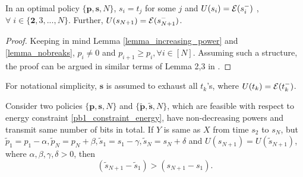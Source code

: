 \begin{lemma}
In an optimal policy $\{\bm{p},\bm{s},N\}$, $s_i=t_j$ for some $j$ and $U(s_i)=\mathcal{E}(s_i^-)$  ,  $\forall \;i\in\{\bm{2},3,...,N\}$. Further, $U(s_{N+1})=\mathcal{E}(s^-_{N+1})$.
\label{lemma_energy_consumed} 
\end{lemma}
\begin{proof}
Keeping in mind Lemma \ref{lemma_increasing_power} and \ref{lemma_nobreaks},  $p_i\neq 0$ and $p_{i+1}\ge p_i,\forall i\in [N]$. Assuming such a structure, the proof can be argued in similar terms of Lemma 2,3 in \cite{Yang}. 
\end{proof}	
For notational simplicity, $\bm{s}$ is assumed to exhaust all $t_k$'s, where $U(t_k)= \mathcal{E}(t_k^-)$.
  
\begin{lemma}
Consider two policies $\{\bm{p},\bm{s},N\}$  and $\{\bm{\widetilde{p}},\bm{\widetilde{s}},N\}$, which are feasible with respect to energy constraint \eqref{pb1_constraint_energy}, have non-decreasing powers and transmit same number of bits in total. If $Y$ is same as $X$ from time $s_2$ to $s_{N}$, but $\widetilde{p}_1=p_1-\alpha,\widetilde{p}_N=p_N+\beta, \widetilde{s}_1=s_1-\gamma, \widetilde{s}_N=s_N+\delta $ and $U(s_{N+1})=U(\widetilde{s}_{N+1})$, where $\alpha ,\beta,\gamma,\delta>0$, then
\begin{equation*}
(\widetilde{s}_{N+1}-\widetilde{s}_1)>(s_{N+1}-s_1).
\end{equation*}

% 

\label{lemma_increase_time}
\end{lemma}
